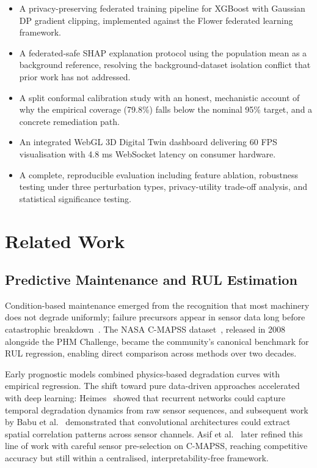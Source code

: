 \documentclass[10pt, journal, letterpaper]{IEEEtran}
\begin{document}
\begin{itemize}
  \item A privacy-preserving federated training pipeline for XGBoost with
  Gaussian DP gradient clipping, implemented against the Flower federated
  learning framework.
  \item A federated-safe SHAP explanation protocol using the population mean
  as a background reference, resolving the background-dataset isolation
  conflict that prior work has not addressed.
  \item A split conformal calibration study with an honest, mechanistic
  account of why the empirical coverage (79.8\%) falls below the nominal
  95\% target, and a concrete remediation path.
  \item An integrated WebGL 3D Digital Twin dashboard delivering 60 FPS
  visualisation with 4.8 ms WebSocket latency on consumer hardware.
  \item A complete, reproducible evaluation including feature ablation,
  robustness testing under three perturbation types, privacy-utility
  trade-off analysis, and statistical significance testing.
\end{itemize}

\section{Related Work}
\label{sec:literature}

\subsection{Predictive Maintenance and RUL Estimation}

Condition-based maintenance emerged from the recognition that most machinery
does not degrade uniformly; failure precursors appear in sensor data long
before catastrophic breakdown~\cite{jardine2006,sikorska2011}. The NASA
C-MAPSS dataset~\cite{cmapss}, released in 2008 alongside the PHM Challenge,
became the community's canonical benchmark for RUL regression, enabling
direct comparison across methods over two decades.

Early prognostic models combined physics-based degradation curves with
empirical regression. The shift toward pure data-driven approaches accelerated
with deep learning: Heimes~\cite{heimes2008} showed that recurrent networks
could capture temporal degradation dynamics from raw sensor sequences, and
subsequent work by Babu et al.~\cite{babu2016} demonstrated that convolutional
architectures could extract spatial correlation patterns across sensor channels.
Asif et al.~\cite{asif2022} later refined this line of work with careful
sensor pre-selection on C-MAPSS, reaching competitive accuracy but still
within a centralised, interpretability-free framework.
\end{document}
